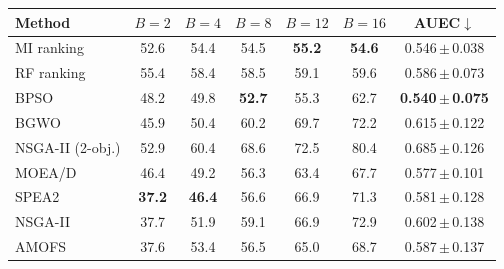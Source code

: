 \begin{tabular}{lcccccc}
\toprule
Method & $B=2$ & $B=4$ & $B=8$ & $B=12$ & $B=16$ & AUEC$\downarrow$ \\
\midrule
MI ranking & 52.6 & 54.4 & 54.5 & \textbf{55.2} & \textbf{54.6} & 0.546\,$\pm$\,0.038 \\
RF ranking & 55.4 & 58.4 & 58.5 & 59.1 & 59.6 & 0.586\,$\pm$\,0.073 \\
BPSO & 48.2 & 49.8 & \textbf{52.7} & 55.3 & 62.7 & \textbf{0.540\,$\pm$\,0.075} \\
BGWO & 45.9 & 50.4 & 60.2 & 69.7 & 72.2 & 0.615\,$\pm$\,0.122 \\
NSGA-II (2-obj.) & 52.9 & 60.4 & 68.6 & 72.5 & 80.4 & 0.685\,$\pm$\,0.126 \\
MOEA/D & 46.4 & 49.2 & 56.3 & 63.4 & 67.7 & 0.577\,$\pm$\,0.101 \\
SPEA2 & \textbf{37.2} & \textbf{46.4} & 56.6 & 66.9 & 71.3 & 0.581\,$\pm$\,0.128 \\
NSGA-II & 37.7 & 51.9 & 59.1 & 66.9 & 72.9 & 0.602\,$\pm$\,0.138 \\
AMOFS & 37.6 & 53.4 & 56.5 & 65.0 & 68.7 & 0.587\,$\pm$\,0.137 \\
\bottomrule
\end{tabular}
